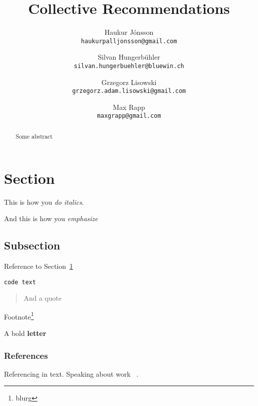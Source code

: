 \documentclass{article}
\title{Collective Recommendations}
\author{
    Haukur J{\'o}nsson \\    \texttt{haukurpalljonsson@gmail.com}
    \and
    Silvan Hungerb{\"u}hler \\   \texttt{silvan.hungerbuehler@bluewin.ch}
    \and
    Grzegorz Lisowski \\  \texttt{grzegorz.adam.lisowski@gmail.com}
    \and
    Max Rapp \\  \texttt{maxgrapp@gmail.com}
}
\begin{document}
\maketitle

\begin{abstract}
Some abstract
\end{abstract}

\section{Section}\label{intro}

This is how you {\it do italics}.

And this is how you {\em emphasize}

\subsection{Subsection}

Reference to Section~\ref{intro}

{\tt code text}

\begin{quote}
And a quote
\end{quote}

Footnote\footnote{blurg}

A bold {\bf letter}

\subsubsection{References}

Referencing   in text. Speaking about work ~\cite{Elkind2015}.



\end{document}
